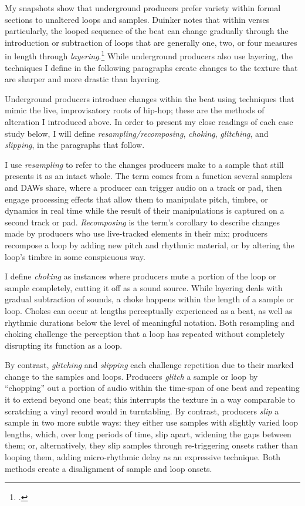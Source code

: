 My snapshots show that underground producers prefer variety within formal sections to unaltered
loops and samples. Duinker notes that within verses particularly, the looped sequence of the beat
can change gradually through the introduction or subtraction of loops that are generally one, two,
or four measures in length through \emph{layering}.\footnote{
    \cite[96]{benduinkerSongFormMainstreaming2020}.} 
While underground producers also use layering, the techniques I define in the following
paragraphs create changes to the texture that are sharper and more drastic than layering.

Underground producers introduce changes within the beat using techniques that mimic the 
live, improvisatory roots of hip-hop; these are the methods of alteration I introduced 
above.  In order to present my close readings of each case study below, I will define 
\emph{resampling/recomposing}, \emph{choking}, \emph{glitching}, and \emph{slipping}, 
in the paragraphs that follow.

I use \emph{resampling} to refer to the changes producers make to a sample that still presents it 
as an intact whole. The term comes from a function several samplers and DAWs share, where a producer
can trigger audio on a track or pad, then engage processing effects that allow them to manipulate 
pitch, timbre, or dynamics in real time while the result of their manipulations is captured on a
second track or pad. \textit{Recomposing} is the term's corollary to describe changes made by
producers who use live-tracked elements in their mix; producers recompose a loop by adding new
pitch and rhythmic material, or by altering the loop's timbre in some conspicuous way.

I define \emph{choking} as instances where producers mute a portion of the loop or sample
completely, cutting it off as a sound source. While layering deals with gradual subtraction
of sounds, a choke happens within the length of a sample or loop. Chokes can occur at lengths
perceptually experienced as a beat, as well as rhythmic durations below the level of meaningful
notation. Both resampling and choking challenge the perception that a loop has repeated without
completely disrupting its function as a loop.

\label{glitch}
By contrast, \emph{glitching} and \emph{slipping} each challenge repetition due to their marked 
change to the samples and loops. Producers \emph{glitch} a sample or loop by ``chopping'' out
a portion of audio within the time-span of one beat and repeating it to extend beyond one beat; 
this interrupts the texture in a way comparable to scratching a vinyl record would in turntabling. 
By contrast, producers \emph{slip} a sample in two more subtle ways: they either use samples with
slightly varied loop lengths, which, over long periods of time, slip apart, widening the gaps
between them; or, alternatively, they slip samples through re-triggering onsets rather than
looping them, adding micro-rhythmic delay as an expressive technique. Both methods create a 
disalignment of sample and loop onsets.

